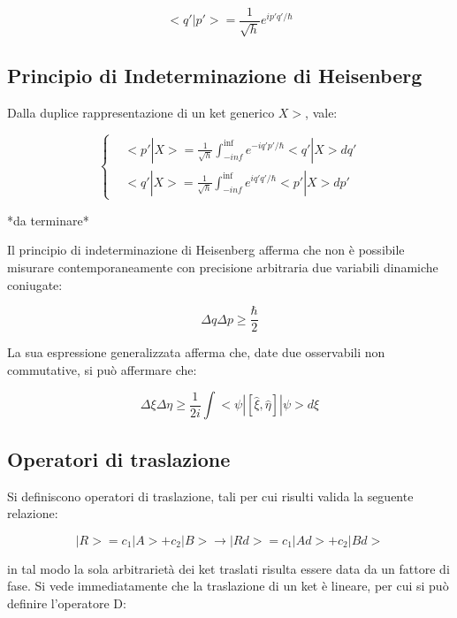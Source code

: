 \documentclass{article}
\begin{document}
\begin{equation}
    <q'|p'>= \frac{1}{\sqrt{h}}e^{ip'q'/\hbar}
\end{equation}



\subsection{Principio di Indeterminazione di Heisenberg}
Dalla duplice rappresentazione di un ket generico $X>$, vale:

\begin{equation}
    \left \{
    \begin{aligned}
    & <p'|X>= \frac{1}{\sqrt{h}} \int_{-inf}^{\inf} e^{-iq'p'/\hbar} <q' |X> dq' \\
    & <q'|X>= \frac{1}{\sqrt{h}} \int_{-inf}^{\inf} e^{iq'q'/\hbar} <p' |X> dp'
    \end{aligned}
    \right.
\end{equation}

*da terminare*

Il principio di indeterminazione di Heisenberg afferma che non è possibile misurare contemporaneamente con precisione arbitraria due variabili dinamiche coniugate:

\begin{equation}
    \Delta q \Delta p \geq \frac{\hbar}{2}
\end{equation}

La sua espressione generalizzata afferma che, date due osservabili non commutative, si può affermare che:

\begin{equation}
    \Delta \xi \Delta \eta \geq \frac{1}{2i}\int <\psi|[\hat{\xi},\hat{\eta}]|\psi>d\xi
\end{equation}

\subsection{Operatori di traslazione}
Si definiscono operatori di traslazione, tali per cui risulti valida la seguente relazione:

\begin{equation}
    |R>=c_1|A>+c_2|B> \rightarrow |Rd>=c_1|Ad>+c_2|Bd>
\end{equation}

in tal modo la sola arbitrarietà dei ket traslati risulta essere data da un fattore di fase.
Si vede immediatamente che la traslazione di un ket è lineare, per cui si può definire l'operatore D:
\end{document}
